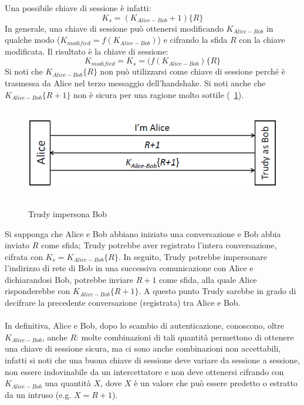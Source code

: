 Una possibile chiave di sessione è infatti:
\begin{equation}
K_{s} = (K_{Alice-Bob}+1)\lbrace R\rbrace
\end{equation}
In generale, una chiave di sessione può ottenersi modificando $K_{Alice-Bob}$ in qualche modo ($K_{modified} = f(K_{Alice-Bob})$) e cifrando la sfida $R$ con la chiave modificata. Il risultato è la chiave di sessione:
\begin{equation}
K_{modified} = K_{s} = (f(K_{Alice-Bob})\lbrace R\rbrace
\end{equation}
Si noti che $K_{Alice-Bob}\lbrace R\rbrace$ non può utilizzarsi come chiave di sessione perché è trasmessa da Alice nel terzo messaggio dell'handshake.
\newline \newline
Si noti anche che $K_{Alice-Bob}\lbrace R+1\rbrace$ non è sicura per una ragione molto sottile (\figurename~\ref{fig:ImgS65bis}).
\begin{figure}[htbp]
	\centering%
	\subfigure%
	{\includegraphics[height=4cm, width=12cm, keepaspectratio]{Immagini/autenticazione/ImgS65bis.png}}
	\caption{Trudy impersona Bob}\label{fig:ImgS65bis} 	
\end{figure}
Si supponga che Alice e Bob abbiano iniziato una conversazione e Bob abbia inviato $R$ come sfida; Trudy potrebbe aver registrato l'intera conversazione, cifrata con $K_{s} = K_{Alice-Bob}\lbrace R\rbrace$. In seguito, Trudy potrebbe impersonare l'indirizzo di rete di Bob in una successiva comunicazione con Alice e dichiarandosi Bob, potrebbe inviare $R+1$ come sfida, alla quale Alice risponderebbe con $K_{Alice-Bob}\lbrace R+1\rbrace$. A questo punto Trudy sarebbe in grado di decifrare la precedente conversazione (registrata) tra Alice e Bob.\\ \\
In definitiva, Alice e Bob, dopo lo scambio di autenticazione, conoscono, oltre $K_{Alice-Bob}$, anche $R$: molte combinazioni di tali quantità permettono di ottenere una chiave di sessione sicura, ma ci sono anche combinazioni non accettabili, infatti si noti che una buona chiave di sessione deve variare da sessione a sessione, non essere indovinabile da un intercettatore e non deve ottenersi cifrando con $K_{Alice-Bob}$ una quantità $X$, dove $X$ è un valore che può essere predetto o estratto da un intruso (e.g. $X = R + 1$).
